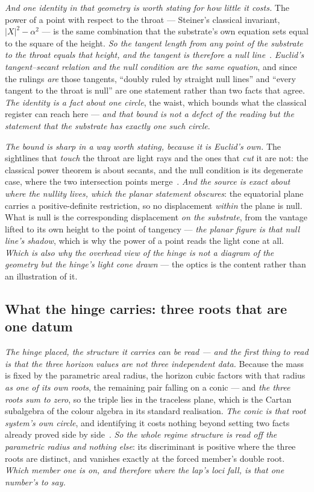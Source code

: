 \documentclass[11pt,a4paper]{article}
\theoremstyle{plain}
\theoremstyle{definition}
\begin{document}
\emph{And one identity in that geometry is worth stating for how little it costs.} The power of a point with
respect to the throat --- Steiner's classical invariant, $|X|^{2}-\alpha^{2}$ --- is the same combination
that the substrate's own equation sets equal to the square of the height. \emph{So the tangent length from
any point of the substrate to the throat equals that height, and the tangent is therefore a null
line}~\cite{JanzenGeometricCore}. \emph{Euclid's tangent--secant relation and the null condition are the same
equation}, and since the rulings \emph{are} those tangents, ``doubly ruled by straight null lines'' and
``every tangent to the throat is null'' are one statement rather than two facts that agree. \emph{The
identity is a fact about one circle}, the waist, which bounds what the classical register can reach here ---
\emph{and that bound is not a defect of the reading but the statement that the substrate has exactly one such
circle}.

\emph{The bound is sharp in a way worth stating, because it is Euclid's own.} The sightlines that
\emph{touch} the throat are light rays and the ones that \emph{cut} it are not: the classical power theorem
is about secants, and the null condition is its degenerate case, where the two intersection points
merge~\cite{JanzenGeometricCore}. \emph{And the source is exact about where the nullity lives, which the
planar statement obscures}: the equatorial plane carries a positive-definite restriction, so no displacement
\emph{within} the plane is null. What is null is the corresponding displacement \emph{on the substrate},
from the vantage lifted to its own height to the point of tangency --- \emph{the planar figure is that null
line's shadow}, which is why the power of a point reads the light cone at all. \emph{Which is also why the overhead
view of the hinge is not a diagram of the geometry but the hinge's light cone drawn} --- the optics is the
content rather than an illustration of it.

\subsection{What the hinge carries: three roots that are one datum}

\emph{The hinge placed, the structure it carries can be read --- and the first thing to read is that the
three horizon values are not three independent data.} Because the mass is fixed by the
parametric areal radius, the horizon cubic factors with that radius \emph{as one of its own roots}, the
remaining pair falling on a conic --- and \emph{the three roots sum to zero}, so the triple lies in the
traceless plane, which is the Cartan subalgebra of the colour algebra in its standard realisation. \emph{The
conic is that root system's own circle}, and identifying it costs nothing beyond setting two facts already
proved side by side~\cite{JanzenSlicing}. \emph{So the whole regime structure is read off the parametric
radius and nothing else}: its discriminant is positive where the three roots are distinct, and vanishes
exactly at the forced member's double root. \emph{Which member one is on, and therefore where the lap's loci
fall, is that one number's to say.}
\end{document}
